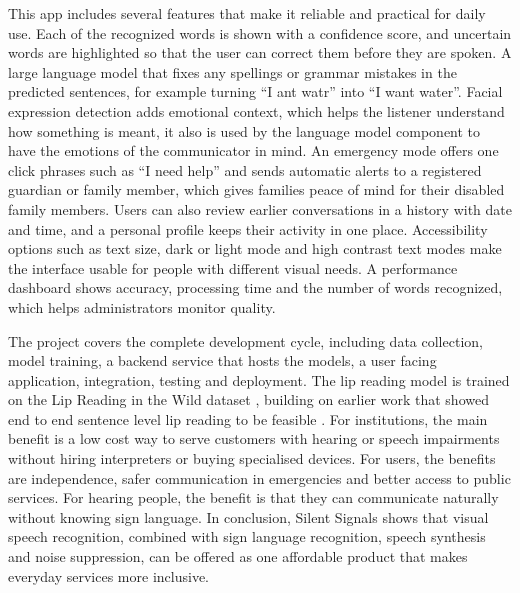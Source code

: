 \documentclass{FastFyp}
\begin{document}
This app includes several features that make it reliable and practical for daily use. 
Each of the recognized words is shown with a confidence score, and uncertain words are highlighted so that the user can correct them before they are spoken. 
A large language model that fixes any spellings or grammar mistakes in the predicted sentences, 
for example turning ``I ant watr'' into ``I want water''. Facial expression detection adds emotional context, 
which helps the listener understand how something is meant, it also is used by the language model component to have the emotions of the communicator in mind. 
An emergency mode offers one click phrases such as ``I need help'' and sends automatic alerts to a registered guardian or family member, 
which gives families peace of mind for their disabled family members. 
Users can also review earlier conversations in a history with date and time, 
and a personal profile keeps their activity in one place. 
Accessibility options such as text size, dark or light mode and 
high contrast text modes make the interface usable for people with different visual needs. 
A performance dashboard shows accuracy, processing time and the number of words recognized, 
which helps administrators monitor quality.

The project covers the complete development cycle, including data collection, model training, a backend service that hosts the models, a user facing application, integration, testing and deployment. 
The lip reading model is trained on the Lip Reading in the Wild dataset \cite{ref:Chung:2016}, 
building on earlier work that showed end to end sentence level lip reading to be feasible \cite{assael2016lipnet}. 
For institutions, the main benefit is a low cost way to serve customers with hearing or speech impairments without hiring interpreters or buying specialised devices. For users, the benefits are independence, safer communication in emergencies and better access to public services. For hearing people, the benefit is that they can communicate naturally without knowing sign language. In conclusion, Silent Signals shows that visual speech recognition, combined with sign language recognition, speech synthesis and noise suppression, can be offered as one affordable product that makes everyday services more inclusive. 
\pagebreak


\pagestyle{fancy} %
\tableofcontents

\clearpage
{}
{}
\listoffigures

\clearpage
{}
{}
\listoftables
\end{document}

